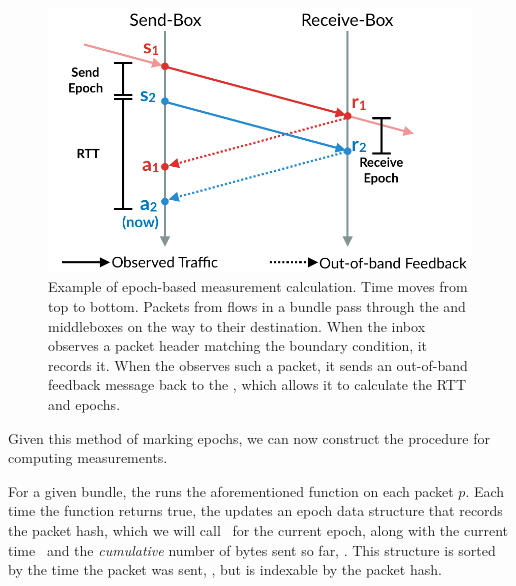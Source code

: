 \begin{figure}
    \centering
    \includegraphics[width=\columnwidth]{img/rate-calculation}
    \caption{Example of epoch-based measurement calculation. Time moves from top to bottom.
    Packets from flows in a bundle
    pass through the \inbox and \outbox middleboxes on the way to their destination. When 
    the inbox observes a packet header matching the boundary condition, it records it. When
    the \outbox observes such a packet, it sends an out-of-band feedback message back to
    the \inbox, which allows it to calculate the RTT and epochs.}\label{fig:ratecalc}
\end{figure}

Given this method of marking epochs, we can now construct the procedure for computing measurements.

For a given bundle, the \inbox runs the aforementioned function on each packet $p$. Each time
the function returns true, the \inbox updates an epoch data structure that records the packet hash,
which we will call \hptwo\ for the current epoch, 
along with the current time \stwo\ and the \emph{cumulative} number of bytes sent so far, \senttwo. This structure
is sorted by the time the packet was sent, \stwo, but is indexable by the packet hash.

